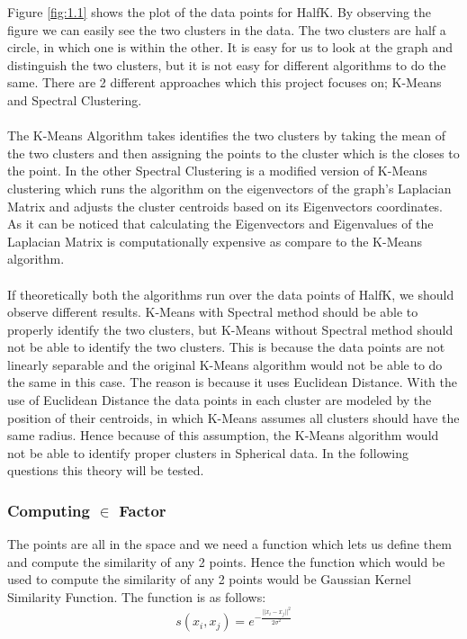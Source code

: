 \documentclass[unicode,11pt,a4paper,oneside,numbers=endperiod,openany]{scrartcl}
\begin{document}
Figure \ref{fig:1.1} shows the plot of the data points for HalfK. By observing the figure we can easily see the two clusters in the data. The two clusters are half a circle, in which one is within the other. It is easy for us to look at the graph and distinguish the two clusters, but it is not easy for different algorithms to do the same. There are 2 different approaches which this project focuses on; K-Means and Spectral Clustering.
\\ \\
The K-Means Algorithm takes identifies the two clusters by taking the mean of the two clusters and then assigning the points to the cluster which is the closes to the point. In the other Spectral Clustering is a modified version of K-Means clustering which runs the algorithm on the eigenvectors of the graph's Laplacian Matrix and adjusts the cluster centroids based on its Eigenvectors coordinates. As it can be noticed that calculating the Eigenvectors and Eigenvalues of the Laplacian Matrix is computationally expensive as compare to the K-Means algorithm.
\\ \\
If theoretically both the algorithms run over the data points of HalfK, we should observe different results. K-Means with Spectral method should be able to properly identify the two clusters, but K-Means without Spectral method should not be able to identify the two clusters. This is because the data points are not linearly separable and the original K-Means algorithm would not be able to do the same in this case. The reason is because it uses Euclidean Distance. With the use of Euclidean Distance the data points in each cluster are modeled by the position of their centroids, in which K-Means assumes all clusters should have the same radius. Hence because of this assumption, the K-Means algorithm would not be able to identify proper clusters in Spherical data. In the following questions this theory will be tested.

\subsubsection{Computing $\in$ Factor}
The points are all in the space and we need a function which lets us define them and compute the similarity of any 2 points. Hence the function which would be used to compute the similarity of any 2 points would be Gaussian Kernel Similarity Function. The function is as follows:
\begin{equation}
    s(x_i, x_j) = e^{-\frac{||x_i - x_j||^2}{2\sigma^2}}
\end{equation}
\end{document}
